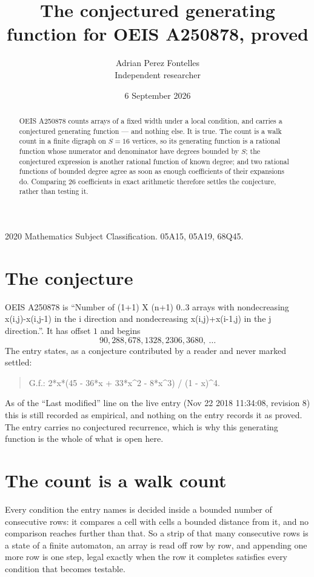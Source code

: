 \documentclass[11pt,a4paper]{article}
\title{The conjectured generating function for OEIS A250878, proved}
\author{Adrian Perez Fontelles\\ \small Independent researcher}
\date{6 September 2026}
\theoremstyle{plain}
\theoremstyle{definition}
\begin{document}
\maketitle

\begin{abstract}
OEIS A250878 counts arrays of a fixed width under a local condition, and carries a conjectured
generating function --- and nothing else. It is true. The count is a walk count in a finite
digraph on $S=16$ vertices, so its generating function is a rational function whose numerator
and denominator have degrees bounded by $S$; the conjectured expression is another rational
function of known degree; and two rational functions of bounded degree agree as soon as enough
coefficients of their expansions do. Comparing $26$ coefficients in exact arithmetic
therefore settles the conjecture, rather than testing it.
\end{abstract}

\noindent\small 2020 Mathematics Subject Classification. 05A15, 05A19, 68Q45.\normalsize

\section{The conjecture}

OEIS A250878 is ``Number of (1+1) X (n+1) 0..3 arrays with nondecreasing x(i,j)-x(i,j-1) in the i direction and nondecreasing x(i,j)+x(i-1,j) in the j direction.''. It has offset $1$ and begins
\[
90, 288, 678, 1328, 2306, 3680,\ \dots
\]
The entry states, as a conjecture contributed by a reader and never marked settled:
\begin{quote}
G.f.: 2*x*(45 - 36*x + 33*x\^{}2 - 8*x\^{}3) / (1 - x)\^{}4.
\end{quote}
As of the ``Last modified'' line on the live entry (Nov 22 2018 11:34:08, revision 8) this is still
recorded as empirical, and nothing on the entry records it as proved. The entry carries no
conjectured recurrence, which is why this generating function is the whole of what is open
here.

\section{The count is a walk count}

Every condition the entry names is decided inside a bounded number of consecutive rows: it
compares a cell with cells a bounded distance from it, and no comparison reaches further than
that. So a strip of that many consecutive rows is a state of a finite automaton, an array is
read off row by row, and appending one more row is one step, legal exactly when the row it
completes satisfies every condition that becomes testable.
\end{document}
